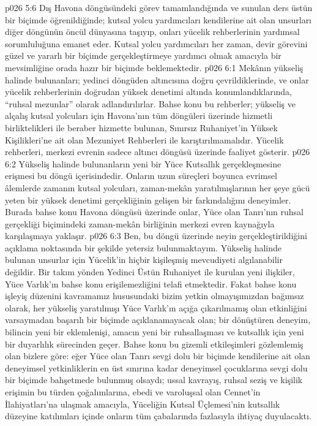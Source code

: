 \vs p026 5:6 Dış Havona döngüsündeki görev tamamlandığında ve sunulan ders üstün bir biçimde öğrenildiğinde; kutsal yolcu yardımcıları kendilerine ait olan unsurları diğer döngünün öncül dünyasına taşıyıp, onları yücelik rehberlerinin yardımsal sorumluluğuna emanet eder. Kutsal yolcu yardımcıları her zaman, devir görevini güzel ve yararlı bir biçimde gerçekleştirmeye yardımcı olmak amacıyla bir mevsimliğine orada hazır bir biçimde beklemektedir.
\vs p026 6:1 Mekânın yükseliş halinde bulunanları; yedinci döngüden altıncısına doğru çevrildiklerinde, ve onlar yücelik rehberlerinin doğrudan yüksek denetimi altında konumlandıklarında, “ruhsal mezunlar” olarak adlandırılırlar. Bahse konu bu rehberler; yükseliş ve alçalış kutsal yolcuları için Havona’nın tüm döngüleri üzerinde hizmetli birliktelikleri ile beraber hizmette bulunan, Sınırsız Ruhaniyet’in Yüksek Kişilikleri’ne ait olan Mezuniyet Rehberleri ile karıştırılmamalıdır. Yücelik rehberleri, merkezi evrenin sadece altıncı döngüsü üzerinde faaliyet gösterir.
\vs p026 6:2 Yükseliş halinde bulunanların yeni bir Yüce Kutsallık gerçekleşmesine erişmesi bu döngü içerisindedir. Onların uzun süreçleri boyunca evrimsel âlemlerde zamanın kutsal yolcuları, zaman\hyp{}mekân yaratılmışlarının her şeye gücü yeten bir yüksek denetimi gerçekliğinin gelişen bir farkındalığını deneyimler. Burada bahse konu Havona döngüsü üzerinde onlar, Yüce olan Tanrı’nın ruhsal gerçekliği biçimindeki zaman\hyp{}mekân birliğinin merkezi evren kaynağıyla karşılaşmaya yaklaşır.
\vs p026 6:3 Ben, bu döngü üzerinde neyin gerçekleştirildiğini açıklama noktasında bir şekilde yetersiz bulunmaktayım. Yükseliş halinde bulunan unsurlar için Yücelik’in hiçbir kişileşmiş mevcudiyeti algılanabilir değildir. Bir takım yönden Yedinci Üstün Ruhaniyet ile kurulan yeni ilişkiler, Yüce Varlık’ın bahse konu erişilemezliğini telafi etmektedir. Fakat bahse konu işleyiş düzenini kavramamız hususundaki bizim yetkin olmayışımızdan bağımsız olarak, her yükseliş yaratılmışı Yüce Varlık’ın açığa çıkarılmamış olan etkinliğini varsaymadan başarılı bir biçimde açıklanamayacak olan; bir dönüştüren deneyim, bilincin yeni bir eklemlenişi, amacın yeni bir ruhsallaşması ve kutsallık için yeni bir duyarlılık sürecinden geçer. Bahse konu bu gizemli etkileşimleri gözlemlemiş olan bizlere göre: eğer Yüce olan Tanrı sevgi dolu bir biçimde kendilerine ait olan deneyimsel yetkinliklerin en üst sınırına kadar deneyimsel çocuklarına sevgi dolu bir biçimde bahşetmede bulunmuş olsaydı; ussal kavrayış, ruhsal seziş ve kişilik erişimin bu türden çoğalımlarına, ebedi ve varoluşsal olan Cennet’in İlahiyatları’na ulaşmak amacıyla, Yüceliğin Kutsal Üçlemesi’nin kutsallık düzeyine katılımları içinde onların tüm çabalarında fazlasıyla ihtiyaç duyulacaktı.
